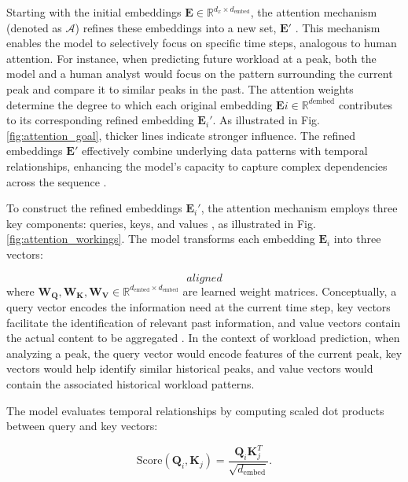 \documentclass{ieeetmlcn}
\begin{document}
Starting with the initial embeddings $\mathbf{E} \in \mathbb{R}^{d_x \times d_{\text{embed}}}$, the attention mechanism (denoted as $\mathcal{A}$) refines these embeddings into a new set, $\mathbf{E}'$ \cite{vaswani2017attention}. This mechanism enables the model to selectively focus on specific time steps, analogous to human attention. For instance, when predicting future workload at a peak, both the model and a human analyst would focus on the pattern surrounding the current peak and compare it to similar peaks in the past. The attention weights determine the degree to which each original embedding $\mathbf{E}i \in \mathbb{R}^{d{\text{embed}}}$ contributes to its corresponding refined embedding $\mathbf{E}_i'$. As illustrated in Fig. \ref{fig:attention_goal}, thicker lines indicate stronger influence. The refined embeddings $\mathbf{E}'$ effectively combine underlying data patterns with temporal relationships, enhancing the model's capacity to capture complex dependencies across the sequence \cite{dai2019transformer}.

To construct the refined embeddings $\mathbf{E}_i'$, the attention mechanism employs three key components: queries, keys, and values \cite{vaswani2017attention}, as illustrated in Fig. \ref{fig:attention_workings}. The model transforms each embedding $\mathbf{E}_i$ into three vectors:

\begin{equation}
    \begin{equation*}
aligned
\end{equation*}
\end{equation}
where $\mathbf{W_Q}, \mathbf{W_K}, \mathbf{W_V} \in \mathbb{R}^{d_{\text{embed}} \times d_{\text{embed}}}$ are learned weight matrices. Conceptually, a query vector encodes the information need at the current time step, key vectors facilitate the identification of relevant past information, and value vectors contain the actual content to be aggregated \cite{bahdanau2014neural}. In the context of workload prediction, when analyzing a peak, the query vector would encode features of the current peak, key vectors would help identify similar historical peaks, and value vectors would contain the associated historical workload patterns.

The model evaluates temporal relationships by computing scaled dot products between query and key vectors:

\begin{equation}
    \text{Score}(\mathbf{Q}_i, \mathbf{K}_j) = \frac{\mathbf{Q}_i \mathbf{K}_j^T}{\sqrt{d_{\text{embed}}}}.
\end{equation}
\end{document}
